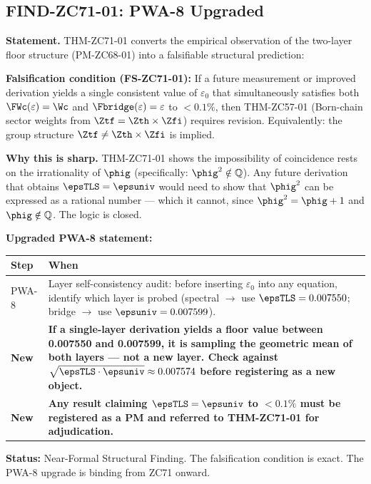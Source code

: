 \documentclass[12pt, a4paper]{article}
\begin{document}
\subsection{FIND-ZC71-01: PWA-8 Upgraded}
\label{sec:find01}

\begin{derivedbox}[title={FIND-ZC71-01: PWA-8 Upgraded ---
  Layer Orthogonality Is a Falsifiable Prediction ($R_0$)}]

\textbf{Statement.}
THM-ZC71-01 converts the empirical observation of the two-layer
floor structure (PM-ZC68-01) into a falsifiable structural prediction:

\medskip
\textbf{Falsification condition (FS-ZC71-01):}
If a future measurement or improved derivation yields a single
consistent value of $\varepsilon_0$ that simultaneously satisfies
both $\FWc(\varepsilon) = \Wc$ and $\Fbridge(\varepsilon) = \varepsilon$
to $<0.1\%$, then THM-ZC57-01 (Born-chain sector weights from
$\Ztf = \Zth\times\Zfi$) requires revision.
Equivalently: the group structure $\Ztf \neq \Zth\times\Zfi$ is implied.

\textbf{Why this is sharp.}
THM-ZC71-01 shows the impossibility of coincidence rests on the
irrationality of $\phig$ (specifically: $\phig^2 \notin \mathbb{Q}$).
Any future derivation that obtains $\epsTLS = \epsuniv$ would need
to show that $\phig^2$ can be expressed as a rational number ---
which it cannot, since $\phig^2 = \phig + 1$ and $\phig \notin \mathbb{Q}$.
The logic is closed.

\textbf{Upgraded PWA-8 statement:}

\medskip
\begin{center}
{\small\renewcommand{\arraystretch}{1.25}
\begin{tabular}{@{}p{1.0cm}p{11.0cm}@{}}
\toprule
Step & When \\
\midrule
PWA-8 & Layer self-consistency audit: before inserting $\varepsilon_0$ into any equation,
        identify which layer is probed (spectral $\to$ use $\epsTLS = 0.007550$;
        bridge $\to$ use $\epsuniv = 0.007599$). \\
\textbf{New} & \textbf{If a single-layer derivation yields a floor value between
        0.007550 and 0.007599, it is sampling the geometric mean of both layers ---
        not a new layer. Check against $\sqrt{\epsTLS\cdot\epsuniv} \approx 0.007574$
        before registering as a new object.} \\
\textbf{New} & \textbf{Any result claiming $\epsTLS = \epsuniv$ to $<0.1\%$ must be
        registered as a PM and referred to THM-ZC71-01 for adjudication.} \\
\bottomrule
\end{tabular}
}
\end{center}

\textbf{Status:} Near-Formal Structural Finding.
The falsification condition is exact.
The PWA-8 upgrade is binding from ZC71 onward.
\end{derivedbox}
\end{document}
